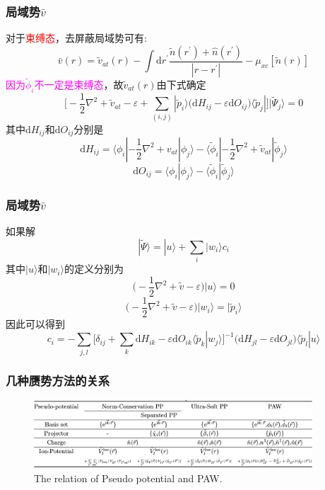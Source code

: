 \documentclass[cjk,slidestop,compress,mathserif,blue]{beamer}
\begin{document}
\frame
{
	\frametitle{\textrm{局域势$\bar v$}}
	对于\textcolor{red}{束缚态}，去屏蔽局域势可有:$$\bar v(r)=\tilde v_{at}(r)-\int\mathrm{d}r^{\prime}\dfrac{\tilde n(r^{\prime})+\hat n(r^{\prime})}{|r-r^{\prime}|}-\mu_{xc}[\tilde n(r)]$$
	\textcolor{magenta}{因为$\tilde\phi_i$不一定是束缚态}，故$\tilde v_{at}(r)$由下式确定
	$$\bigg[-\dfrac12\nabla^2+\tilde v_{at}-\varepsilon+\sum_{(i,j)}|\tilde p_i\rangle\big(\mathrm{d}H_{ij}-\varepsilon\mathrm{d}O_{ij}\big)\langle\tilde p_j|\bigg]|\tilde\Psi_j\rangle=0$$
	其中$\mathrm{d}H_{ij}$和$\mathrm{d}O_{ij}$分别是
	$$\mathrm{d}H_{ij}=\langle\phi_i|-\dfrac12\nabla^2+v_{at}|\phi_j\rangle-\langle\tilde\phi_i|-\dfrac12\nabla^2+\tilde v_{at}|\tilde\phi_j\rangle$$
	$$\mathrm{d}O_{ij}=\langle\phi_i|\phi_j\rangle-\langle\tilde\phi_i|\tilde\phi_j\rangle$$
}

\frame
{
	\frametitle{\textrm{局域势$\bar v$}}
	如果解$$|\tilde\Psi\rangle=|u\rangle+\sum_i|w_i\rangle c_i$$
	其中$|u\rangle$和$|w_i\rangle$的定义分别为
	$$\big(-\frac12\nabla^2+\tilde v-\varepsilon\big)|u\rangle=0$$
	$$\big(-\frac12\nabla^2+\tilde v-\varepsilon\big)|w_i\rangle=|\tilde p_i\rangle$$
	因此可以得到
	$$c_i=-\sum_{j,l}\bigg[\delta_{ij}+\sum_k\mathrm{d}H_{ik}-\varepsilon\mathrm{d}O_{ik}\langle\tilde p_k|w_j\rangle\bigg]^{-1}\big(\mathrm{d}H_{jl}-\varepsilon\mathrm{d}O_{jl}\big)\langle\tilde p_l|u\rangle$$
}

\frame
{
	\frametitle{几种赝势方法的关系}
\begin{figure}[h!]
\centering
\includegraphics[height=1.0in,width=4.1in,clip]{Figures/Pseudo-Potential.png}
\caption{\tiny \textrm{The relation of Pseudo potential and PAW.}}%
\label{Pseudo_Potential_PAW}
\end{figure}
}

\end{document}
